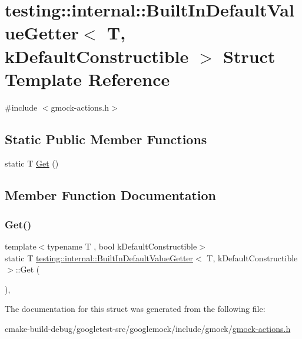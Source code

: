 \hypertarget{structtesting_1_1internal_1_1BuiltInDefaultValueGetter}{}\section{testing\+::internal\+::Built\+In\+Default\+Value\+Getter$<$ T, k\+Default\+Constructible $>$ Struct Template Reference}
\label{structtesting_1_1internal_1_1BuiltInDefaultValueGetter}


{\ttfamily \#include $<$gmock-\/actions.\+h$>$}

\subsection*{Static Public Member Functions}
\begin{DoxyCompactItemize}
\item 
static T \mbox{\hyperlink{structtesting_1_1internal_1_1BuiltInDefaultValueGetter_a61c47c50cdb6ab488dabe2cec3b97fc8}{Get}} ()
\end{DoxyCompactItemize}


\subsection{Member Function Documentation}
\mbox{\label{structtesting_1_1internal_1_1BuiltInDefaultValueGetter_a61c47c50cdb6ab488dabe2cec3b97fc8}} 
\subsubsection{\texorpdfstring{Get()}{Get()}}
{\footnotesize\ttfamily template$<$typename T , bool k\+Default\+Constructible$>$ \\
static T \mbox{\hyperlink{structtesting_1_1internal_1_1BuiltInDefaultValueGetter}{testing\+::internal\+::\+Built\+In\+Default\+Value\+Getter}}$<$ T, k\+Default\+Constructible $>$\+::Get (\begin{DoxyParamCaption}{ }\end{DoxyParamCaption})\hspace{0.3cm}{\ttfamily [inline]}, {\ttfamily [static]}}



The documentation for this struct was generated from the following file\+:\begin{DoxyCompactItemize}
\item 
cmake-\/build-\/debug/googletest-\/src/googlemock/include/gmock/\mbox{\hyperlink{gmock-actions_8h}{gmock-\/actions.\+h}}\end{DoxyCompactItemize}
